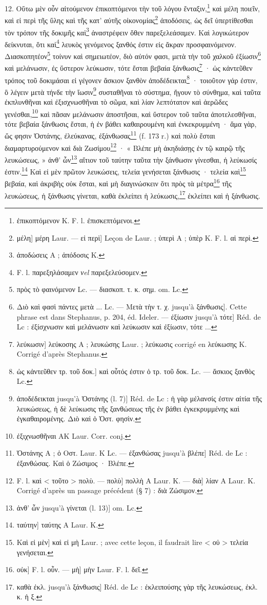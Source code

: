 \documentclass[landscape, a4paper, 11pt, oneside, polutonikogreek, french]{article}
\begin{document}
12. Οὕτω μὲν οὖν αἰτούμενον ἐπικοπτόμενοι τὴν τοῦ λόγου ἔνταξιν,\footnote{ἐπικοπτόμενον K. F. l. ἐπισκεπτόμενοι.} καὶ μέλη ποιεῖν, καὶ εἰ περὶ τῆς ὕλης καὶ τῆς κατ' αὐτῆς οἰκονομίας\footnote{μέλη] μέρη Laur. --- εἰ περὶ] Leçon de Laur. ; ὑπερὶ A ; ὑπὲρ K. F. l. αἱ περὶ.} ἀποδόσεις, ὡς δεῖ ὑπερτίθεσθαι τὸν τρόπον τῆς δοκιμῆς καὶ\footnote{ἀποδώσεις A ; ἀπόδοσις K.} ἀναστρέφειν ὅθεν παρεξελεάσαμεν. Καὶ λογικώτερον δείκνυται, ὅτι καὶ\footnote{F. l. παρεξηλάσαμεν \emph{νel} παρεξελεύσομεν.} λευκὸς γενόμενος ξανθός ἐστιν εἰς ἄκραν προσφαινόμενον. Διασκοπητέον\footnote{πρὸς τὸ φαινόμενον Lc. --- διασκοπ. τ. κ. σημ. om. Lc.} τοίνυν καὶ σημειωτέον, διὸ αὐτόν φασι, μετὰ τὴν τοῦ χαλκοῦ ἐξίωσιν\footnote{Διὸ καὶ φασὶ πάντες μετὰ ... Lc. --- Mετὰ τὴν τ. χ. jusqu'à ξάνθωσις]. Cette phrase est dans Stephanus, p. 204, éd. Ideler. --- ἐξίωσιν jusqu'à τότε] Réd. de Lc : ἐξίσχνωσιν καὶ μελάνωσιν καὶ λεύκωσιν καὶ ἐξίωσιν, τότε ...} καὶ μελάνωσιν, ἐς ὕστερον λεύκωσιν, τότε ἔσται βεβαία ξάνθωσις\footnote{λεύκωσιν] λεύκοσης A ; λευκώσης Laur. ; λεύκωσις corrigé en λεύκωσης K. Corrigé d'après Stephanus.} · ὡς κἀντεῦθεν τρόπος τοῦ δοκιμάσαι εἰ γέγονεν ἄσκιον ξανθὸν ἀποδέδεικται\footnote{ὡς κἀντεῦθεν τρ. τοῦ δοκ.] καὶ οὗτός ἐστιν ὁ τρ. τοῦ δοκ. Lc. --- ἄσκιος ξανθὸς Lc.} · τοιοῦτον γάρ ἐστιν, ὃ λέγειν μετὰ τήνδε τὴν ἴωσιν\footnote{ἀποδέδεικται jusqu'à Ὀστάνης (l. 7)] Réd. de Lc : ἡ γὰρ μέλανσίς ἐστιν αἰτία τῆς λευκώσεως, ἡ δὲ λεύκωσις τῆς ξανθώσεως τῆς ἐν βάθει ἐγκεκρυμμένης καὶ ἐγκαθαιρομένης. Διὸ καὶ ὁ Ὁστ. φησὶν.} συσταθῆναι τὸ σύστημα, ἤγουν τὸ σύνθημα, καὶ ταῦτα ἐκπλυνθῆναι καὶ ἐξισχνωσθῆναι τὸ σῶμα, καὶ λίαν λεπτότατον καὶ ἀερῶδες γενέσθαι,\footnote{ἐξιχνωσθῆναι AK Laur. Corr. conj.} καὶ πᾶσαν μελάνωσιν ἀποστῆσαι, καὶ ὕστερον τοῦ ταῦτα ἀποτελεσθῆναι, τότε βεβαία ξάνθωσις ἔσται, ἡ ἐν βάθει καθαιρουμένη καὶ ἐνκεκρυμμένη · ἅμα γὰρ, ὥς φησιν Ὀστάνης, ἐλεύκανας, ἐξάνθωσας\footnote{Ὁστάνης A ; ὁ Oστ. Laur. K Lc. --- ἐξανθώσας jusqu'à βλέπε] Réd. de Lc : ἐξανθώσας. Καὶ ὁ Ζώσιμος · Βλέπε.} (f. 173 r.) καὶ πολὺ ἔσται διαμαρτυρούμενον καὶ διὰ Ζωσίμου\footnote{F. l. καὶ < τοῦτο > πολὺ. --- πολὺ] πολλὴ A Laur. K. --- διὰ] λίαν A Laur. K. Corrigé d'après un passage précédent (§ 7) : διὰ Ζώσιμον.} · « Βλέπε μὴ ἀκηδιάσῃς ἐν τῷ καιρῷ τῆς λευκώσεως, » ἀνθ' ὧν\footnote{ἀνθ' ὧν jusqu'à γίνεται (l. 13)] om. Lc.} αἴτιον τοῦ ταύτην ταῦτα τὴν ξάνθωσιν γίνεσθαι, ἡ λεύκωσίς ἐστιν.\footnote{ταύτην] ταύτης A Laur. K.} Καὶ εἰ μὲν πρῶτον λευκώσεις, τελεία γενήσεται ξάνθωσις · τελεία καὶ\footnote{Καὶ εἰ μὲν] καὶ εἰ μὴ Laur. ; avec cette leçon, il faudrait lire < οὐ > τελεία γενήσεται.} βεβαία, καὶ ἀκριβὴς οὐκ ἔσται, καὶ μὴ διαγινώσκειν ὅτι πρὸς τὰ μέτρα\footnote{οὐκ] F. l. οὖν. --- μὴ] μὴν Laur. F. l. δεῖ.} τῆς λευκώσεως, ἡ ξάνθωσις γίνεται, καθὰ ἐκλείπει ἡ λεύκωσις,\footnote{καθὰ ἐκλ. jusqu'à ξάνθωσις] Réd. de Lc : ἐκλειπούσης γὰρ τῆς λευκώσεως, ἐκλ. κ. ἡ ξ.} ἐκλείπει καὶ ἡ ξάνθωσις.
\end{document}
